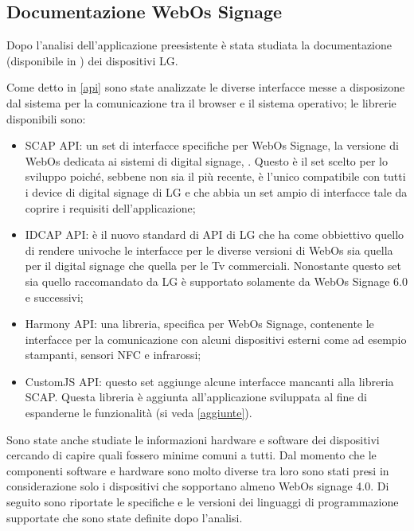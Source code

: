 \subsection{Documentazione WebOs Signage}\label{webos_doc}

Dopo l'analisi dell'applicazione preesistente è stata studiata la documentazione (disponibile in \cite{LgDoc}) dei dispositivi LG.

Come detto in \ref*{api} sono state analizzate le diverse interfacce messe a disposizone dal sistema per la comunicazione tra il browser e il sistema operativo; le librerie disponibili sono: 
\begin{itemize}
    \item SCAP API: un set di interfacce specifiche per WebOs Signage, la versione di WebOs dedicata ai sistemi di digital signage, . Questo è il set scelto per lo sviluppo poiché, sebbene non sia il più recente, è l'unico compatibile con tutti i device di digital signage di LG e che abbia un set ampio di interfacce tale da coprire i requisiti dell'applicazione;
    \item IDCAP API: è il nuovo standard di API di LG che ha come obbiettivo quello di rendere univoche le interfacce per le diverse versioni di WebOs sia quella per il digital signage che quella per le Tv commerciali. Nonostante questo set sia quello raccomandato da LG è supportato solamente da WebOs Signage 6.0 e successivi;
    \item Harmony API: una libreria, specifica per WebOs Signage, contenente le interfacce per la comunicazione con alcuni dispositivi esterni come ad esempio stampanti, sensori NFC e infrarossi;
    \item CustomJS API: questo set aggiunge alcune interfacce mancanti alla libreria SCAP. Questa libreria è aggiunta all'applicazione sviluppata al fine di espanderne le funzionalità (si veda \ref*{aggiunte}).
\end{itemize}

Sono state anche studiate le informazioni hardware e software dei dispositivi cercando di capire quali fossero  minime comuni a tutti. Dal momento che le componenti software e hardware sono molto diverse tra loro sono stati presi in considerazione solo i dispositivi che sopportano almeno WebOs signage 4.0. Di seguito sono riportate le specifiche e le versioni dei linguaggi di programmazione supportate che sono state definite dopo l'analisi.

